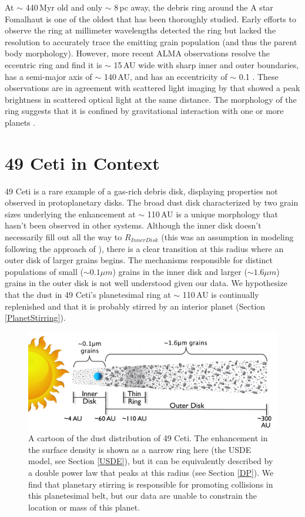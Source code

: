 At $\sim$ 440\,Myr old and only $\sim$ 8\,pc away, the debris ring around the A star Fomalhaut is one of the oldest that has been thoroughly studied. Early efforts to observe the ring at millimeter wavelengths \citep{Holl98,Ricc12} detected the ring but lacked the resolution to accurately trace the emitting grain population (and thus the parent body morphology). However, more recent ALMA observations resolve the eccentric ring and find it is $\sim$ 15\,AU wide with sharp inner and outer boundaries, has a semi-major axis of $\sim$ 140\,AU, and has an eccentricity of $\sim$ 0.1 \citep{Bole12}. These observations are in agreement with scattered light imaging by \cite{Kala05} that showed a peak brightness in scattered optical light at the same distance. The morphology of the ring suggests that it is confined by gravitational interaction with one or more planets \citep{Chia09}.

\section{49 Ceti in Context}

49 Ceti is a rare example of a gas-rich debris disk, displaying properties not observed in protoplanetary disks. The broad dust disk characterized by two grain sizes underlying the enhancement at $\sim$ 110\,AU is a unique morphology that hasn't been observed in other systems. Although the inner disk doesn't necessarily fill out all the way to $R_{Inner Disk}$ (this was an assumption in modeling following the approach of \citealt{Wahh07}), there is a clear transition at this radius where an outer disk of larger grains begins. The mechanisms responsible for distinct populations of small ($\sim 0.1 \mu m$) grains in the inner disk and larger ($\sim 1.6 \mu m$) grains in the outer disk is not well understood given our data. We hypothesize that the dust in 49 Ceti's planetesimal ring at $\sim$ 110\,AU is continually replenished and that it is probably stirred by an interior planet (Section \ref{PlanetStirring}). 

\begin{figure}
	\includegraphics[width = 1\textwidth]{49CET_DustDistributionCartoon2_ForThesis.png}
	\caption{A cartoon of the dust distribution of 49 Ceti. The enhancement in the surface density is shown as a narrow ring here (the USDE model, see Section \ref{USDE}), but it can be equivalently described by a double power law that peaks at this radius (see Section \ref{DP}). We find that planetary stirring is responsible for promoting collisions in this planetesimal belt, but our data are unable to constrain the location or mass of this planet.}
	\label{fig:49CET_DDC}
\end{figure}

